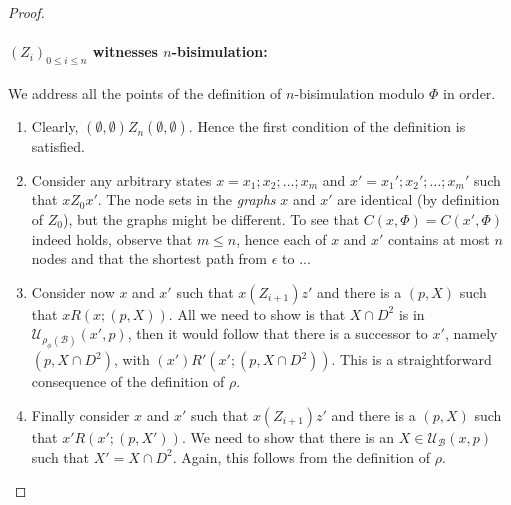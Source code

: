 \documentclass{llncs}
\newcommand{\sdepth}[2]{d_{#1}(#2)}
\newcommand{\carriers}[1]{Q_{#1}}
\newcommand{\kmod}[2]{{\cal K}_{(#1,#2)}}
\newcommand{\update}[3]{{\mathcal U}_{#1}(#2,#3)}
\newcommand{\views}{\mathcal B}
\newcommand{\sem}{\varepsilon}
\begin{document}
\begin{proof}
\paragraph{$(Z_i)_{0 \leq i \leq n}$ witnesses $n$-bisimulation:} We address all the points of the definition of $n$-bisimulation modulo $\Phi$ in order.
\begin{enumerate}
\item Clearly, $(\emptyset, \emptyset) Z_n (\emptyset, \emptyset)$. Hence the first condition of the definition is satisfied. 
\item Consider any arbitrary states $x = x_1;x_2;\dots;x_m$ and $x' = x_1';x_2';\dots;x_m'$ such that $x Z_0 x'$. The node sets in the \emph{graphs} $x$ and $x'$ are identical (by definition of $Z_0$), but the graphs might be different. To see that $C(x, \Phi) = C(x', \Phi)$ indeed holds, observe that $m \leq n$, hence each of $x$ and $x'$ contains at most $n$ nodes and that the shortest path from $\epsilon$ to ...
\item Consider now $x$ and $x'$ such that $x (Z_{i + 1}) z'$ and there is a $(p, X)$ such that $x R (x;(p, X))$. All we need to show is that $X \cap D^2$ is in $\update {\rho_\phi(\views)} {x'} p$, then it would follow that there is a successor to $x'$, namely $(p, X \cap D^2)$, with $(x')R'(x';(p, X \cap D^2))$. This is a straightforward consequence of the definition of $\rho$. 
\item Finally consider $x$ and $x'$ such that $x (Z_{i + 1}) z'$ and there is a $(p, X)$ such that $x' R (x';(p, X'))$. We need to show that there is an $X \in \update \views x p$ such that $X' = X \cap D^2$. Again, this follows from the definition of $\rho$.
\end{enumerate}
\end{proof}




\end{document}

